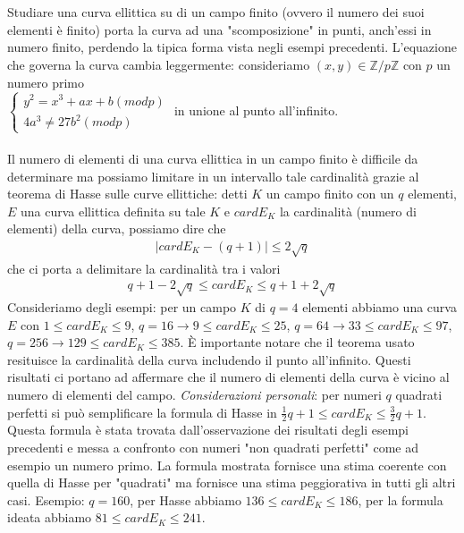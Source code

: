 \documentclass[a4paper,12pt]{tesiinfo}
\begin{document}
\\
\\
Studiare una curva ellittica su di un campo finito (ovvero il numero dei suoi elementi \`e finito) porta la curva ad una "scomposizione" in punti, anch'essi in numero finito, perdendo la tipica forma vista negli esempi precedenti. L'equazione che governa la curva cambia leggermente: consideriamo $(x, y) \in \mathbb{Z}/p\mathbb{Z}$ con $p$ un numero primo\\
$\begin{cases}
y^2 = x^3 + ax+b (mod p)\\
4a^3 \ne 27b^2  (mod p)
\end{cases}$
in unione al punto all'infinito.\\
\\
Il numero di elementi di una curva ellittica in un campo finito \`e difficile da determinare ma possiamo limitare in un intervallo tale cardinalit\`a grazie al teorema di Hasse sulle curve ellittiche: detti $K$ un campo finito con un $q$ elementi, $E$ una curva ellittica definita su tale $K$ e $cardE_K$ la cardinalit\`a (numero di elementi) della curva, possiamo dire che
\begin{align*}
    \mid cardE_K - (q+1) \mid \le 2 \sqrt{q}
\end{align*}
che ci porta a delimitare la cardinalit\`a tra i valori 
\begin{align*}
    q+1-2 \sqrt {q} \le cardE_K \le q+1+2 \sqrt {q}
\end{align*}
Consideriamo degli esempi: per un campo $K$ di $q=4$ elementi abbiamo una curva $E$ con $1 \le cardE_K \le 9$, $q=16 \to 9 \le cardE_K \le 25$, $q=64 \to 33 \le cardE_K \le 97$, $q=256 \to 129 \le cardE_K \le 385$. \`E importante notare che il teorema usato resituisce la cardinalit\`a della curva includendo il punto all'infinito.
Questi risultati ci portano ad affermare che il numero di elementi della curva \`e vicino al numero di elementi del campo. 
\textit{Considerazioni personali}: per numeri $q$ quadrati perfetti si pu\`o semplificare la formula di Hasse in $ \frac{1}{2}q +1 \le cardE_K \le \frac{3}{2}q +1$. Questa formula \`e stata trovata dall'osservazione dei risultati degli esempi precedenti e messa a confronto con numeri "non quadrati perfetti" come ad esempio un numero primo. La formula mostrata fornisce una stima coerente con quella di Hasse per "quadrati" ma fornisce una stima peggiorativa in tutti gli altri casi. Esempio: $q=160$, per Hasse abbiamo $136 \le cardE_K \le 186$, per la formula ideata abbiamo $81 \le cardE_K \le 241$. 
\end{document}
